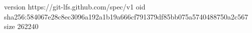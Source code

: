 version https://git-lfs.github.com/spec/v1
oid sha256:584067e28c8ec3096a192a1b19a666cf791379df85bb075a5740488750a2c567
size 262240
